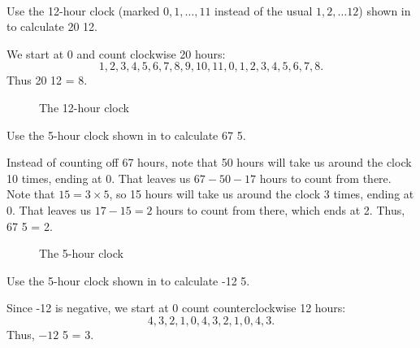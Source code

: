 \begin{exam}
\label{exam_eval_mod_clock}
~
    \begin{apart}
        \item Use the 12-hour clock (marked $0,1, \ldots, 11$ instead of the usual $1,2, \ldots 12$) shown in  to calculate 20  12.
               
        \begin{soln}
            We start at 0 and count clockwise 20 hours: $$1,2,3,4,5,6,7,8,9,10, 11,0,1,2,3,4,5,6,7,8.$$
            Thus 20  12 = 8.
        \end{soln} 

        \begin{figure}[hbtp]
            \centering
            
            \caption{The 12-hour clock}
            \label{fig_mod12_clock}
            \end{figure}
        
        \item Use the 5-hour clock shown in  to calculate 67  5.
            
        \begin{soln}
              Instead of counting off 67 hours, note that 50 hours will take us around the clock 10 times, ending at 0.  That leaves us $67-50-17$ hours to count from there.  Note that $15 = 3 \times 5$, so 15 hours will take us around the clock 3 times, ending at 0.  That leaves us $17-15 = 2$ hours to count from there, which ends at 2. Thus, 67  5 = 2.
         \end{soln}   

            \begin{figure}[ht]
            \centering
            
            \caption{The 5-hour clock}
            \label{fig_mod5_clock}
            \end{figure}
            
        \item Use the 5-hour clock shown in  to calculate -12  5.
            \begin{soln}
                Since -12 is negative, we start at 0 count counterclockwise 12 hours:
                $$4,3,2,1,0,4,3,2,1,0,4,3.$$
                Thus, $-12$  5 = 3.
            \end{soln}
    \end{apart}
\end{exam}

